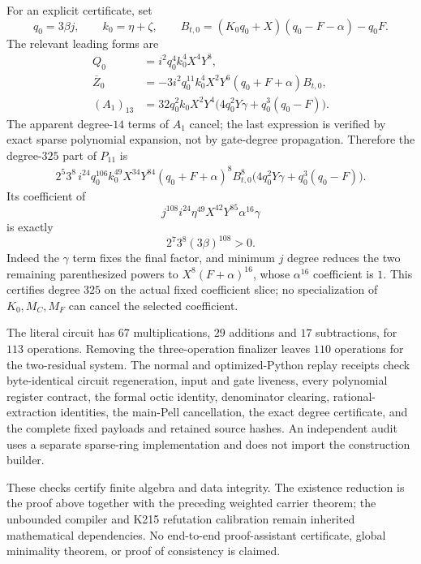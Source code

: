 For an explicit certificate, set
\[
 q_0=3\beta j,\qquad k_0=\eta+\zeta,\qquad
 B_{t,0}=(K_0q_0+X)(q_0-F-\alpha)-q_0F.
\]
The relevant leading forms are
\begin{align*}
 Q_0&=i^2q_0^4k_0^4X^4Y^8,\\
 \overline Z_0&=-3i^2q_0^{11}k_0^4X^2Y^6
                      (q_0+F+\alpha)B_{t,0},\\
 (A_1)_{13}&=32q_0^2k_0X^2Y^4
                   \bigl(4q_0^2Y\gamma+q_0^3(q_0-F)\bigr).
\end{align*}
The apparent degree-$14$ terms of $A_1$ cancel; the last expression is
verified by exact sparse polynomial expansion, not by gate-degree
propagation. Therefore the degree-$325$ part of $P_{11}$ is
\begin{align*}
 2^5 3^8\,i^{24}q_0^{106}k_0^{49}X^{34}Y^{84}
 (q_0+F+\alpha)^8B_{t,0}^8
 \bigl(4q_0^2Y\gamma+q_0^3(q_0-F)\bigr).
\end{align*}
Its coefficient of
\begin{equation}
 j^{108}i^{24}\eta^{49}X^{42}Y^{85}\alpha^{16}\gamma
 \label{rt11:coefficientmonomial}
\end{equation}
is exactly
\[
 2^7 3^8(3\beta)^{108}>0.
\]
Indeed the $\gamma$ term fixes the final factor, and minimum $j$ degree
reduces the two remaining parenthesized powers to
$X^8(F+\alpha)^{16}$, whose $\alpha^{16}$ coefficient is $1$.
This certifies degree $325$ on the actual fixed coefficient slice; no
specialization of $K_0,M_C,M_F$ can cancel the selected coefficient.

The literal circuit has $67$ multiplications, $29$ additions and
$17$ subtractions, for $113$ operations. Removing the three-operation
finalizer leaves $110$ operations for the two-residual system. The
normal and optimized-Python replay receipts check byte-identical circuit
regeneration, input and gate liveness, every polynomial register contract,
the formal octic identity, denominator clearing, rational-extraction
identities, the main-Pell cancellation, the exact degree certificate,
and the complete fixed payloads and retained source hashes.
An independent audit uses a separate sparse-ring implementation and
does not import the construction builder.

These checks certify finite algebra and data integrity. The existence
reduction is the proof above together with the preceding weighted carrier
theorem; the unbounded compiler and K215 refutation calibration remain
inherited mathematical dependencies. No end-to-end proof-assistant
certificate, global minimality theorem, or proof of consistency is claimed.
